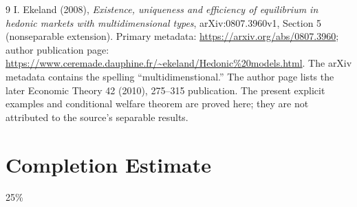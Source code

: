 \documentclass[11pt,a4paper]{article}
\theoremstyle{remark}
\begin{document}
\begin{thebibliography}{9}
 I. Ekeland (2008), \emph{Existence, uniqueness and efficiency of equilibrium in hedonic markets with multidimensional types}, arXiv:0807.3960v1, Section 5 (nonseparable extension). Primary metadata: \url{https://arxiv.org/abs/0807.3960}; author publication page: \url{https://www.ceremade.dauphine.fr/~ekeland/Hedonic%20models.html}. The arXiv metadata contains the spelling ``multidimenstional.'' The author page lists the later Economic Theory 42 (2010), 275--315 publication. The present explicit examples and conditional welfare theorem are proved here; they are not attributed to the source's separable results.
\end{thebibliography}

\section{Completion Estimate}
25\%
\end{document}
